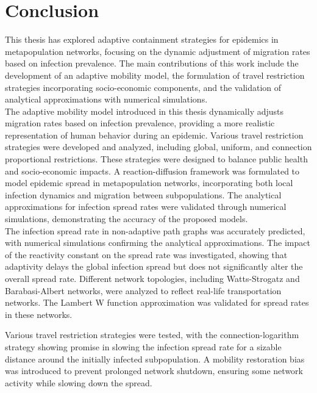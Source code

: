 \section{Conclusion}

This thesis has explored adaptive containment strategies for epidemics in metapopulation networks, focusing on the dynamic adjustment of migration rates based on infection prevalence. The main contributions of this work include the development of an adaptive mobility model, the formulation of travel restriction strategies incorporating socio-economic components, and the validation of analytical approximations with numerical simulations.\\

The adaptive mobility model introduced in this thesis dynamically adjusts migration rates based on infection prevalence, providing a more realistic representation of human behavior during an epidemic. Various travel restriction strategies were developed and analyzed, including global, uniform, and connection proportional restrictions. These strategies were designed to balance public health and socio-economic impacts. A reaction-diffusion framework was formulated to model epidemic spread in metapopulation networks, incorporating both local infection dynamics and migration between subpopulations. The analytical approximations for infection spread rates were validated through numerical simulations, demonstrating the accuracy of the proposed models.\\

The infection spread rate in non-adaptive path graphs was accurately predicted, with numerical simulations confirming the analytical approximations. The impact of the reactivity constant on the spread rate was investigated, showing that adaptivity delays the global infection spread but does not significantly alter the overall spread rate. Different network topologies, including Watts-Strogatz and Barabasi-Albert networks, were analyzed to reflect real-life transportation networks. The Lambert W function approximation was validated for spread rates in these networks.

Various travel restriction strategies were tested, with the connection-logarithm strategy showing promise in slowing the infection spread rate for a sizable distance around the initially infected subpopulation. A mobility restoration bias was introduced to prevent prolonged network shutdown, ensuring some network activity while slowing down the spread.\\

